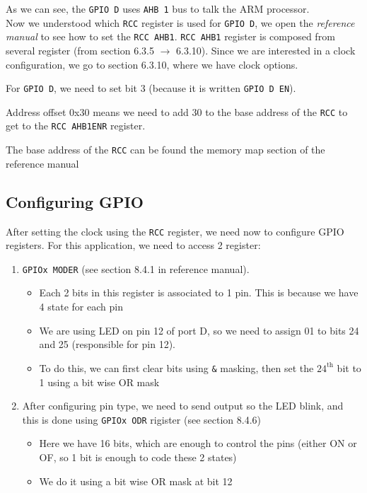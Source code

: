As we can see, the \verb|GPIO D| uses \verb|AHB 1| bus to talk the ARM processor.\\

Now we understood which \verb|RCC| register is used for \verb|GPIO D|, we open the \textit{reference manual} to see how to set the \verb|RCC AHB1|. \verb|RCC AHB1| register is composed from several register (from section 6.3.5 $\rightarrow$ 6.3.10). Since we are interested in a clock configuration, we go to section 6.3.10, where we have clock options.

For \verb|GPIO D|, we need to set bit 3 (because it is written \verb|GPIO D EN|).

Address offset 0x30 means we need to add 30 to the base address of the \verb|RCC| to get to the \verb|RCC AHB1ENR| register.

The base address of the \verb|RCC| can be found the memory map section of the reference manual

\subsection{Configuring GPIO}

After setting the clock using the \verb|RCC| register, we need now to configure GPIO registers. For this application, we need to access 2 register:

\begin{enumerate}
    \item \verb|GPIOx MODER| (see section 8.4.1 in reference manual).
    
    \begin{itemize}
        \item Each 2 bits in this register is associated to 1 pin. This is because we have 4 state for each pin
        
        \item We are using LED on pin 12 of port D, so we need to assign 01 to bits 24 and 25 (responsible for pin 12).
        
        \item To do this, we can first clear bits using \verb|&| masking, then set the $24^\mathrm{th}$ bit to 1 using a bit wise OR mask
        
    \end{itemize}
    

\item After configuring pin type, we need to send output so the LED blink, and this is done using \verb|GPIOx ODR| rigister (see section 8.4.6)

\begin{itemize}
    \item Here we have 16 bits, which are enough to control the pins (either ON or OF, so 1 bit is enough to code these 2 states)
    
    \item We do it using a bit wise OR mask at bit 12
    
\end{itemize}
    
\end{enumerate}


